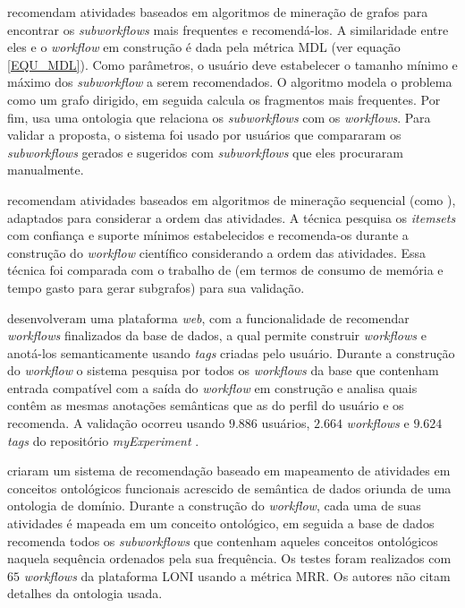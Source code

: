  recomendam atividades baseados em algoritmos de mineração de grafos para encontrar os \emph{subworkflows} mais frequentes e recomendá-los. A similaridade entre eles e o \emph{workflow} em construção é dada pela métrica MDL (ver equação \ref{EQU_MDL}). Como parâmetros, o usuário deve estabelecer o tamanho mínimo e máximo dos \emph{subworkflow} a serem recomendados. O algoritmo modela o problema como um grafo dirigido, em seguida calcula os fragmentos mais frequentes. Por fim, usa uma ontologia que relaciona os \emph{subworkflows} com os \emph{workflows}. Para validar a proposta, o sistema foi usado por usuários que compararam os \emph{subworkflows} gerados e sugeridos com \emph{subworkflows} que eles procuraram manualmente.

 recomendam atividades baseados em algoritmos de mineração sequencial (como ), adaptados para considerar a ordem das atividades. A técnica pesquisa os \emph{itemsets} com confiança e suporte mínimos estabelecidos e recomenda-os durante a construção do \emph{workflow} científico considerando a ordem das atividades. Essa técnica foi comparada com o trabalho de  (em termos de consumo de memória e tempo gasto para gerar subgrafos) para sua validação.
 
 desenvolveram uma plataforma \emph{web}, com a funcionalidade de recomendar \emph{workflows} finalizados da base de dados, a qual permite construir \emph{workflows} e anotá-los semanticamente usando \emph{tags} criadas pelo usuário. Durante a construção do \emph{workflow} o sistema pesquisa por todos os \emph{workflows} da base que contenham entrada compatível com a saída do \emph{workflow} em construção e analisa quais contêm as mesmas anotações semânticas que as do perfil do usuário e os recomenda. A validação ocorreu usando \(9.886\) usuários, \(2.664\) \emph{workflows} e \(9.624\) \emph{tags} do repositório \emph{myExperiment} \cite{ROURE2015}.

 criaram um sistema de recomendação baseado em mapeamento de atividades em conceitos ontológicos funcionais acrescido de semântica de dados oriunda de uma ontologia de domínio. Durante a construção do \emph{workflow}, cada uma de suas atividades é mapeada em um conceito ontológico, em seguida a base de dados recomenda todos os \emph{subworkflows} que contenham aqueles conceitos ontológicos naquela sequência ordenados pela sua frequência. Os testes foram realizados com \(65\) \emph{workflows} da plataforma LONI \cite{Rex2003} usando a métrica MRR. Os autores não citam detalhes da ontologia usada.

